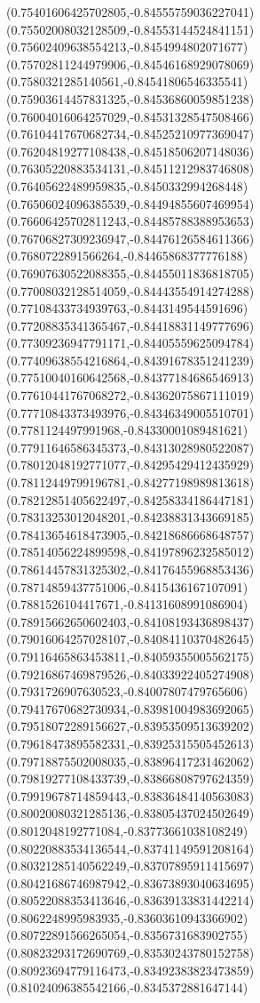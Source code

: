 \documentclass[12pt]{article}
\theoremstyle{plain}
\theoremstyle{definition}
\theoremstyle{remark}
\begin{document}
\begin{figure}
{  (0.75401606425702805,-0.84555759036227041)%
  (0.75502008032128509,-0.84553144524841151)%
  (0.75602409638554213,-0.8454994802071677)%
  (0.75702811244979906,-0.84546168929078069)%
  (0.7580321285140561,-0.84541806546335541)%
  (0.75903614457831325,-0.84536860059851238)%
  (0.76004016064257029,-0.84531328547508466)%
  (0.76104417670682734,-0.84525210977369047)%
  (0.76204819277108438,-0.84518506207148036)%
  (0.76305220883534131,-0.84511212983746808)%
  (0.76405622489959835,-0.8450332994268448)%
  (0.76506024096385539,-0.84494855607469954)%
  (0.76606425702811243,-0.84485788388953653)%
  (0.76706827309236947,-0.84476126584611366)%
  (0.7680722891566264,-0.84465868377776188)%
  (0.76907630522088355,-0.84455011836818705)%
  (0.77008032128514059,-0.84443554914274288)%
  (0.77108433734939763,-0.8443149544591696)%
  (0.77208835341365467,-0.84418831149777696)%
  (0.77309236947791171,-0.84405559625094784)%
  (0.77409638554216864,-0.84391678351241239)%
  (0.77510040160642568,-0.84377184686546913)%
  (0.77610441767068272,-0.84362075867111019)%
  (0.77710843373493976,-0.84346349005510701)%
  (0.7781124497991968,-0.84330001089481621)%
  (0.77911646586345373,-0.84313028980522087)%
  (0.78012048192771077,-0.84295429412435929)%
  (0.78112449799196781,-0.84277198989813618)%
  (0.78212851405622497,-0.84258334186447181)%
  (0.78313253012048201,-0.84238831343669185)%
  (0.78413654618473905,-0.84218686668648757)%
  (0.78514056224899598,-0.84197896232585012)%
  (0.78614457831325302,-0.84176455968853436)%
  (0.78714859437751006,-0.8415436167107091)%
  (0.7881526104417671,-0.84131608991086904)%
  (0.78915662650602403,-0.84108193436898437)%
  (0.79016064257028107,-0.84084110370482645)%
  (0.79116465863453811,-0.84059355005562175)%
  (0.79216867469879526,-0.84033922405274908)%
  (0.7931726907630523,-0.84007807479765606)%
  (0.79417670682730934,-0.83981004983692065)%
  (0.79518072289156627,-0.83953509513639202)%
  (0.79618473895582331,-0.83925315505452613)%
  (0.79718875502008035,-0.83896417231462062)%
  (0.79819277108433739,-0.83866808797624359)%
  (0.79919678714859443,-0.83836484140563083)%
  (0.80020080321285136,-0.83805437024502649)%
  (0.8012048192771084,-0.83773661038108249)%
  (0.80220883534136544,-0.83741149591208164)%
  (0.80321285140562249,-0.83707895911415697)%
  (0.80421686746987942,-0.83673893040634695)%
  (0.80522088353413646,-0.83639133831442214)%
  (0.8062248995983935,-0.83603610943366902)%
  (0.80722891566265054,-0.8356731683902755)%
  (0.80823293172690769,-0.83530243780152758)%
  (0.80923694779116473,-0.83492383823473859)%
  (0.81024096385542166,-0.8345372881647144)%
}
\end{figure}
\end{document}
